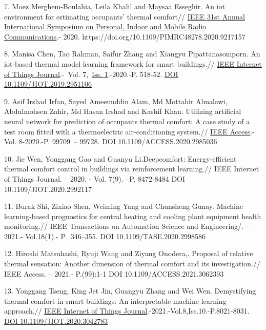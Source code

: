 7. Moez Merghem-Boulahia, Leila Khalil and Maysaa Esseghir. An iot
environment for estimating occupants' thermal comfort//
\href{https://ieeexplore.ieee.org/xpl/conhome/9210501/proceeding}{IEEE
31st Annual International Symposium on Personal, Indoor and Mobile Radio
Communications}.- 2020. https://doi.org/10.1109/PIMRC48278.2020.9217157

8. Manisa Chen, Tao Rahman, Saifur Zhang and Xiangyu Pipattanasomporn.
An iot-based thermal model learning framework for smart buildings.//
\href{https://ieeexplore.ieee.org/xpl/RecentIssue.jsp?punumber=6488907}{IEEE
Internet of Things Journal}.-~Vol.
7,~\href{https://ieeexplore.ieee.org/xpl/tocresult.jsp?isnumber=8955685&punumber=6488907}{Iss.
1}.-2020.-P. 518-52.
\href{https://doi.org/10.1109/JIOT.2019.2951106}{DOI
10.1109/JIOT.2019.2951106}

9. Asif Irshad Irfan, Sayed Ameenuddin Alam, Md Mottahir Almalawi,
Abdulmohsen Zahir, Md Hasan Irshad and Kashif Khan. Utilizing artificial
neural network for prediction of occupants thermal comfort: A case study
of a test room fitted with a thermoelectric air-conditioning system.//
\href{https://ieeexplore.ieee.org/xpl/RecentIssue.jsp?punumber=6287639}{IEEE
Access}.-Vol. 8-2020.-P. 99709~-- 99728. DOI 10.1109/ACCESS.2020.2985036

10. Jie Wen, Yonggang Gao and Guanyu Li.Deepcomfort: Energy-efficient
thermal comfort control in buildings via reinforcement learning.// IEEE
Internet of Things Journal. -- 2020. - Vol. 7(9). --P. 8472-8484 DOI
10.1109/JIOT.2020.2992117

11. Burak Shi, Zixiao Shen, Weiming Yang and Chunsheng Gunay. Machine
learning-based prognostics for central heating and cooling plant
equipment health monitoring.// IEEE Transactions on Automation Science
and Engineering/. -- 2021.- Vol.18(1).- P.~346--355. DOI
10.1109/TASE.2020.2998586

12. Hiroshi Matsuhashi, Ryuji Wang and Ziyang Onodera,. Proposal of
relative thermal sensation: Another dimension of thermal comfort and its
investigation.// IEEE Access. -- 2021.- P.(99):1-1 DOI
10.1109/ACCESS.2021.3062393

13. Yonggang Tseng, King Jet Jin, Guangyu Zhang and Wei Wen.
Demystifying thermal comfort in smart buildings: An interpretable
machine learning approach.//
\href{https://ieeexplore.ieee.org/xpl/RecentIssue.jsp?punumber=6488907}{IEEE
Internet of Things Journal}.-2021.-Vol.8,Iss.10.-P.8021-8031.
\href{https://doi.org/10.1109/JIOT.2020.3042783}{DOI
10.1109/JIOT.2020.3042783}

